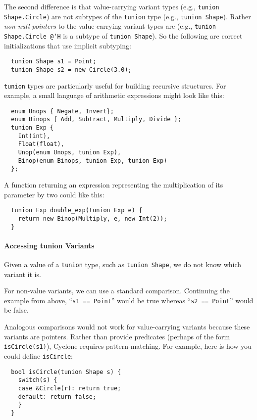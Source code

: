 The second difference is that value-carrying variant types (e.g.,
\texttt{tunion Shape.Circle}) are not subtypes of the \texttt{tunion} type
(e.g., \texttt{tunion Shape}).  Rather \textit{non-null pointers} to the
value-carrying variant types are (e.g., \texttt{tunion Shape.Circle @`H}
is a subtype of \texttt{tunion Shape}).  So the following are correct
initializations that use implicit subtyping:

\begin{verbatim}
  tunion Shape s1 = Point;
  tunion Shape s2 = new Circle(3.0);
\end{verbatim}

\texttt{tunion} types are particularly useful for building recursive
structures.  For example, a small language of arithmetic expressions
might look like this:
\begin{verbatim}
  enum Unops { Negate, Invert};
  enum Binops { Add, Subtract, Multiply, Divide };
  tunion Exp {
    Int(int),
    Float(float),
    Unop(enum Unops, tunion Exp),
    Binop(enum Binops, tunion Exp, tunion Exp)
  };
\end{verbatim}

A function returning an expression representing the multiplication of
its parameter by two could like this:
\begin{verbatim}
  tunion Exp double_exp(tunion Exp e) {
    return new Binop(Multiply, e, new Int(2));
  }
\end{verbatim}

\paragraph{Accessing tunion Variants} Given a value of a \texttt{tunion}
type, such as \texttt{tunion Shape}, we do not know which variant it is.

For non-value variants, we can use a standard comparison.  Continuing
the example from above, ``\texttt{s1 == Point}'' would be true whereas
``\texttt{s2 == Point}'' would be false.

Analogous comparisons would not work for value-carrying variants
because these variants are pointers.  Rather than provide predicates
(perhaps of the form \texttt{isCircle(s1)}), Cyclone requires
pattern-matching.  For example, here is how you could define
\texttt{isCircle}:
\begin{verbatim}
  bool isCircle(tunion Shape s) {
    switch(s) {
    case &Circle(r): return true;
    default: return false;
    }
  }
\end{verbatim}

